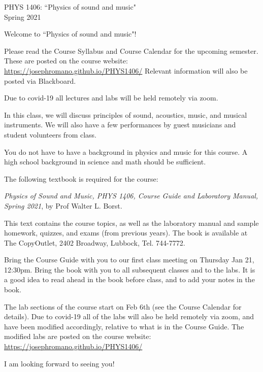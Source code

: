 \documentclass[11pt]{NSF}
\begin{document}
\begin{center}
PHYS 1406: ``Physics of sound and music"\\
Spring 2021
\end{center}

Welcome to ``Physics of sound and music"!

Please read the Course Syllabus and Course Calendar for the upcoming semester. 
These are posted on the course website:
\url{https://josephromano.github.io/PHYS1406/}
Relevant information will also be posted via Blackboard.

Due to covid-19 all lectures and labs will be held remotely via zoom.

In this class, we will discuss principles of sound, acoustics, music,
and musical instruments.  We will also have a few performances by
guest musicians %
and student volunteers from class. 

You do not have to have a background in physics and music for this
course. A high school background in science and math should be
sufficient.

The following textbook is required for the course:

{\em Physics of Sound and Music, PHYS 1406,
Course Guide and Laboratory Manual, Spring 2021}, by Prof Walter L. Borst.

This text contains the course topics, as well as the laboratory manual 
and sample homework, quizzes, and exams (from previous years).
The book is available at
The CopyOutlet, 2402 Broadway, Lubbock, Tel. 744-7772.

Bring the Course Guide with you to our first class meeting on Thursday
Jan 21, 12:30pm. 
Bring the book with you to all subsequent classes and to the labs.  
It is a good idea to read ahead in the book before
class, and to add your notes in the book.


The lab sections of the course start on Feb 6th
(see the Course Calendar for details).
Due to covid-19 all of the labs will also be held remotely via zoom,
and have been modified accordingly, relative to what is in the Course Guide.
The modified labs are posted on the course website:
\url{https://josephromano.github.io/PHYS1406/}


I am looking forward to seeing you!
\end{document}
